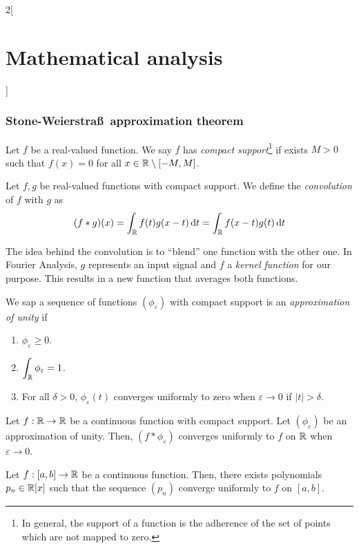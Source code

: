 \documentclass[../../../main_math.tex]{subfiles}
\begin{document}
\begin{multicols}{2}[\section{Mathematical analysis}]
  \subsubsection{Stone-Weierstra\ss\  approximation theorem}
  \begin{definition}
    Let $f$ be a real-valued function. We say $f$ has \emph{compact support}\footnote{In general, the support of a function is the adherence of the set of points which are not mapped to zero.} if exists $M>0$ such that $f(x)=0$ for all $x\in\mathbb{R} \setminus[-M,M]$.
  \end{definition}
  \begin{definition}
    Let $f,g$ be real-valued functions with compact support. We define the \emph{convolution} of $f$ with $g$ as $$(f*g)(x)=\int_{\mathbb{R}} f(t)g(x-t)\dd{t}=\int_{\mathbb{R}}f(x-t)g(t)\dd{t}$$
  \end{definition}
  \begin{remark}
    The idea behind the convolution is to ``blend'' one function with the other one. In Fourier Analysis, $g$ represents an input signal and $f$ a \emph{kernel function} for our purpose. This results in a new function that averages both functions.
  \end{remark}
  \begin{definition}
    We sap a sequence of functions $(\phi_\varepsilon)$ with compact support is an \emph{approximation of unity} if
    \begin{enumerate}
      \item $\phi_\varepsilon\geq 0$.
      \item $\displaystyle\int_{\mathbb{R}} \phi_\varepsilon=1$.
      \item For all $\delta>0$, $\phi_\varepsilon(t)$ converges uniformly to zero when $\varepsilon\rightarrow 0$ if $|t|>\delta$.
    \end{enumerate}
  \end{definition}
  \begin{lemma}
    Let $f:\mathbb{R} \rightarrow\mathbb{R} $ be a continuous function with compact support. Let $(\phi_\varepsilon)$ be an approximation of unity. Then, $(f*\phi_\varepsilon)$ converges uniformly to $f$ on $\mathbb{R} $ when $\varepsilon\rightarrow 0$.
  \end{lemma}
  \begin{theorem}\label{MA:weierstrasspolynomials}
    Let $f:[a,b]\rightarrow\mathbb{R} $ be a continuous function. Then, there exists polynomials $p_n\in\mathbb{R} [x]$ such that the sequence $(p_n)$ converge uniformly to $f$ on $[a,b]$.
  \end{theorem}

\end{multicols}
\end{document}
